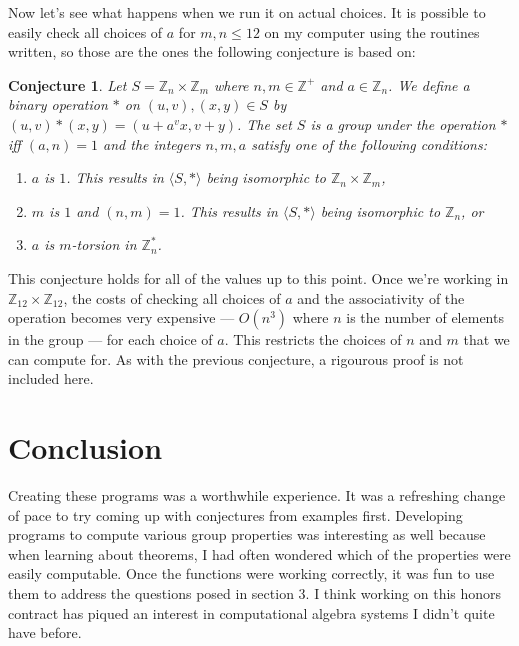 \documentclass[11pt,a4paper]{article}
\newtheorem{conj}{Conjecture}
\theoremstyle{definition}
\begin{document}
Now let's see what happens when we run it on actual choices. It is possible to easily check all choices of $a$ for $m, n \leq 12$ on my computer using the routines written, so those are the ones the following conjecture is based on:

\begin{conj}
Let $S = \mathbb{Z}_n \times \mathbb{Z}_m$ where $n, m \in \mathbb{Z}^+$ and $a \in \mathbb{Z}_n$. We define a binary operation $*$ on $(u, v), (x, y) \in S$ by $(u, v) * (x, y) = (u + a^vx, v + y)$. The set $S$ is a group under the operation $\ast$ iff $(a, n) = 1$ and the integers $n, m, a$ satisfy one of the following conditions:
\begin{enumerate}
  \item $a$ is $1$. This results in $\langle S, \ast \rangle$ being isomorphic to $\mathbb{Z}_n \times \mathbb{Z}_m$,
  \item $m$ is $1$ and $(n, m) = 1$. This results in $\langle S, \ast \rangle$ being isomorphic to $\mathbb{Z}_n$, or
  \item $a$ is $m$-torsion in $\mathbb{Z}_n^\ast$.
\end{enumerate}
\end{conj}

This conjecture holds for all of the values up to this point. Once we're working in $\mathbb{Z}_{12} \times \mathbb{Z}_{12}$, the costs of checking all choices of $a$ and the associativity of the operation becomes very expensive --- $O(n^3)$ where $n$ is the number of elements in the group --- for each choice of $a$. This restricts the choices of $n$ and $m$ that we can compute for. As with the previous conjecture, a rigourous proof is not included here.

\section{Conclusion}

Creating these programs was a worthwhile experience. It was a refreshing change of pace to try coming up with conjectures from examples first. Developing programs to compute various group properties was interesting as well because when learning about theorems, I had often wondered which of the properties were easily computable. Once the functions were working correctly, it was fun to use them to address the questions posed in section 3. I think working on this honors contract has piqued an interest in computational algebra systems I didn't quite have before.
\end{document}
